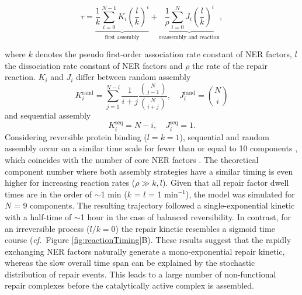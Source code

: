 \begin{equation}
\tau = \underbrace{\frac{1}{k}\sum^{N-1}_{i=0}K_i\left(\frac{l}{k}\right)^i}_{\text{first assembly}} +  \underbrace{\frac{1}{\rho}\sum_{i=0}^{N}J_i \left(\frac{l}{k}\right)^i}_{\text{reassembly and reaction}}, \label{Eqn:taugen}
\end{equation}

where $k$ denotes the pseudo first-order association rate constant of NER factors, $l$ the dissociation rate constant of NER factors and $\rho$ the rate of the repair reaction. $K_i$ and $J_i$ differ between random assembly
\begin{equation}
K_i^\text{rand}= \sum_{j=1}^{N-i}\frac{1}{i+j}\frac{{N \choose j-1}}{{N\choose i+j}} , \quad J_i^\text{rand} = {N\choose i}\label{Eqn:coefrand}
\end{equation} 
and sequential assembly           
\begin{equation}
K_i^\text{seq}= N-i , \quad J_i^\text{seq} = 1.\label{Eqn.coefseq}
\end{equation}
Considering reversible protein binding ($l=k=1$), sequential and random assembly occur on a similar time scale for fewer than or equal to 10 components \cite{Terstiege2010}, which coincides with the number of core NER factors \cite{Luijsterburg2010}. The theoretical component number where both assembly strategies have a similar timing is even higher for increasing reaction rates ($\rho \gg k,l$). Given that all repair factor dwell times are in the order of $\sim$1 min ($k$ = $l$ = 1 $\text{min}^{-\text{1}}$), the model was simulated for $N$ = 9 components. The resulting trajectory followed a single-exponential kinetic with a half-time of $\sim$1 hour in the case of balanced reversibility. In contrast, for an irreversible process ($l/k = 0$) the repair kinetic resembles a sigmoid time course (\textit{cf.}\ Figure \ref{fig:reactionTiming}B). These results suggest that the rapidly exchanging NER factors naturally generate a mono-exponential repair kinetic, whereas the slow overall time span can be explained by the stochastic distribution of repair events. This leads to a large number of non-functional repair complexes before the catalytically active complex is assembled.  


